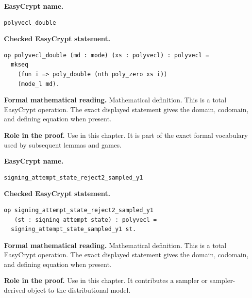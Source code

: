 \begin{formaldefinition}
\noindent\textbf{EasyCrypt name.}
\begin{lstlisting}[language=EasyCrypt,basicstyle=\ttfamily\scriptsize]
polyvecl_double
\end{lstlisting}
\noindent\textbf{Checked EasyCrypt statement.}
\begin{lstlisting}[language=EasyCrypt,basicstyle=\ttfamily\scriptsize]
op polyvecl_double (md : mode) (xs : polyvecl) : polyvecl =
  mkseq
    (fun i => poly_double (nth poly_zero xs i))
    (mode_l md).
\end{lstlisting}
\noindent\textbf{Formal mathematical reading.}
Mathematical definition. This is a total EasyCrypt operation.  The exact displayed statement gives the domain, codomain, and defining equation when present.

\noindent\textbf{Role in the proof.}
Use in this chapter. It is part of the exact formal vocabulary used by subsequent lemmas and games.

\end{formaldefinition}

\begin{formaldefinition}
\noindent\textbf{EasyCrypt name.}
\begin{lstlisting}[language=EasyCrypt,basicstyle=\ttfamily\scriptsize]
signing_attempt_state_reject2_sampled_y1
\end{lstlisting}
\noindent\textbf{Checked EasyCrypt statement.}
\begin{lstlisting}[language=EasyCrypt,basicstyle=\ttfamily\scriptsize]
op signing_attempt_state_reject2_sampled_y1
   (st : signing_attempt_state) : polyvecl =
  signing_attempt_state_sampled_y1 st.
\end{lstlisting}
\noindent\textbf{Formal mathematical reading.}
Mathematical definition. This is a total EasyCrypt operation.  The exact displayed statement gives the domain, codomain, and defining equation when present.

\noindent\textbf{Role in the proof.}
Use in this chapter. It contributes a sampler or sampler-derived object to the distributional model.

\end{formaldefinition}

